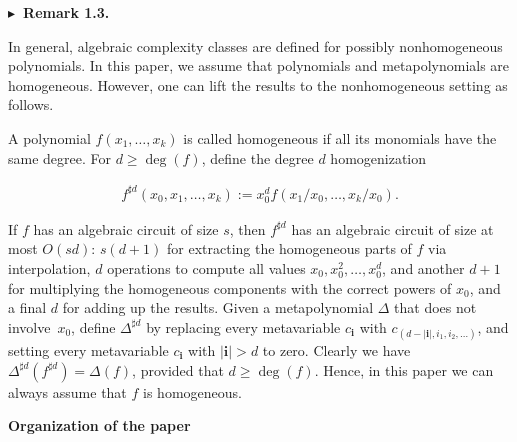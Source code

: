 \documentclass[10pt,a4paper]{article}
\begin{document}
\par\medskip\noindent\textbf{$\blacktriangleright$ Remark 1.3.}\par



In general, algebraic complexity classes are defined for possibly nonhomogeneous polynomials. In this paper, we assume that polynomials and metapolynomials are homogeneous. However, one can lift the results to the nonhomogeneous setting as follows.





A polynomial $f(x_{1},\ldots,x_{k})$ is called homogeneous if all its monomials have the same degree.
For $d\geq\deg(f)$, define the degree $d$ homogenization



\[\begin{aligned}
f^{\sharp d}(x_{0},x_{1},\ldots,x_{k}):=x_{0}^{d}f(x_{1}/x_{0},\ldots,x_{k}/x_{0}).
\end{aligned}\]


If $f$ has an algebraic circuit of size $s$, then $f^{\sharp d}$ has an algebraic circuit of size at most $O(sd)$:
$s(d+1)$ for extracting the homogeneous parts of $f$ via interpolation,
$d$ operations to compute all values $x_{0},x_{0}^{2},\ldots,x_{0}^{d}$,
and another $d+1$ for multiplying the homogeneous components with the correct powers of $x_{0}$, and a final $d$ for adding up the results.
Given a metapolynomial $\Delta$ that does not involve $x_{0}$,
define $\Delta^{\sharp d}$ by replacing every metavariable $c_{\bm{i}}$ with $c_{(d-|\bm{i}|,i_{1},i_{2},\ldots)}$,
and setting every metavariable $c_{\bm{i}}$ with $|\bm{i}|>d$ to zero.
Clearly we have $\Delta^{\sharp d}(f^{\sharp d})=\Delta(f)$, provided that $d\geq\deg(f)$.
Hence, in this paper we can always assume that $f$ is homogeneous.








\par\medskip\noindent\textbf{Organization of the paper}\par
\end{document}
